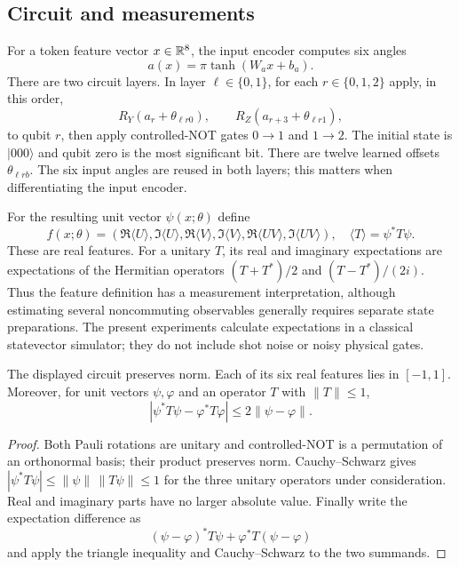 \subsection{Circuit and measurements}

For a token feature vector $x\in\mathbb{R}^8$, the input encoder computes six angles
\[
 a(x)=\pi\tanh(W_a x+b_a).
\]
There are two circuit layers. In layer $\ell\in\{0,1\}$, for each
$r\in\{0,1,2\}$ apply, in this order,
\[
 R_Y(a_r+\theta_{\ell r0}),\qquad
 R_Z(a_{r+3}+\theta_{\ell r1}),
\]
to qubit $r$, then apply controlled-NOT gates $0\to1$ and $1\to2$.
The initial state is $|000\rangle$ and qubit zero is the most significant
bit. There are twelve learned offsets $\theta_{\ell rb}$. The six input
angles are reused in both layers; this matters when differentiating the
input encoder.

For the resulting unit vector $\psi(x;\theta)$ define
\[
 f(x;\theta)=
 (\Re\langle U\rangle,\Im\langle U\rangle,
  \Re\langle V\rangle,\Im\langle V\rangle,
  \Re\langle UV\rangle,\Im\langle UV\rangle),
 \quad \langle T\rangle=\psi^*T\psi.
\]
These are real features. For a unitary $T$, its real and imaginary
expectations are expectations of the Hermitian operators
$(T+T^*)/2$ and $(T-T^*)/(2i)$. Thus the feature definition has a
measurement interpretation, although estimating several noncommuting
observables generally requires separate state preparations. The present
experiments calculate expectations in a classical statevector simulator;
they do not include shot noise or noisy physical gates.

\begin{lemma}
\label{qt:bounds}
The displayed circuit preserves norm. Each of its six real features lies
in $[-1,1]$. Moreover, for unit vectors $\psi,\varphi$ and an operator $T$
with $\|T\|\leq1$,
\[
 |\psi^*T\psi-\varphi^*T\varphi|\leq2\|\psi-\varphi\|.
\]
\end{lemma}
\begin{proof}
Both Pauli rotations are unitary and controlled-NOT is a permutation of an
orthonormal basis; their product preserves norm. Cauchy--Schwarz gives
$|\psi^*T\psi|\leq\|\psi\|\,\|T\psi\|\leq1$ for the three unitary
operators under consideration. Real and imaginary parts have no larger
absolute value. Finally write the expectation difference as
\[
 (\psi-\varphi)^*T\psi+\varphi^*T(\psi-\varphi)
\]
and apply the triangle inequality and Cauchy--Schwarz to the two summands.
\end{proof}

